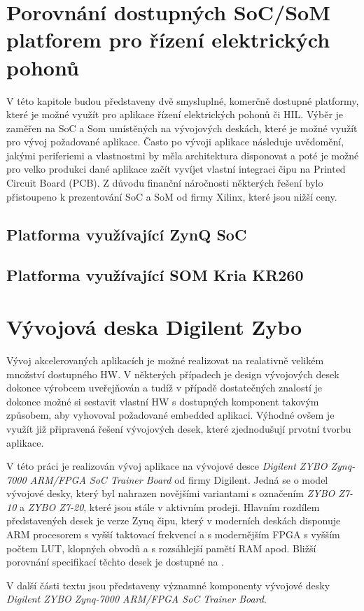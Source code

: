 \documentclass[a4paper, twoside, 11pt]{article}
\begin{document}
	\section{Porovnání dostupných SoC/SoM platforem pro řízení elektrických pohonů}
			V této kapitole budou představeny dvě smysluplné, komerčně dostupné platformy, které je možné využít pro aplikace řízení elektrických pohonů či HIL. Výběr je zaměřen na SoC a Som umístěných na vývojových deskách, které je možné využít pro vývoj požadované aplikace. Často po vývoji aplikace následuje uvědomění, jakými periferiemi a vlastnostmi by měla architektura disponovat a poté je možné pro velko produkci dané aplikace začít vyvíjet vlastní integraci čipu na Printed Circuit Board (PCB). Z důvodu finanční náročnosti některých řešení bylo přistoupeno k prezentování SoC a SoM od firmy Xilinx, které jsou nižší ceny.


			\subsection{Platforma využívající ZynQ SoC}

			\subsection{Platforma využívající SOM Kria KR260}

	\section{Vývojová deska Digilent Zybo}
			Vývoj akcelerovaných aplikacích je možné realizovat na realativně velikém množství dostupného HW. V některých případech je design vývojových desek dokonce výrobcem uveřejňován a tudíž v případě dostatečných znalostí je dokonce možné si sestavit vlastní HW s dostupných komponent takovým způsobem, aby vyhovoval požadované embedded aplikaci. Výhodné ovšem je využít již připravená řešení vývojových desek, které zjednodušují prvotní tvorbu aplikace.\par
			V této práci je realizován vývoj aplikace na vývojové desce \textit{Digilent ZYBO Zynq-7000 ARM/FPGA SoC Trainer Board} od firmy Digilent. \cite{digilent-zybo-7000-docs} Jedná se o model vývojové desky, který byl nahrazen novějšími variantami s označením \textit{ZYBO Z7-10} a \textit{ZYBO Z7-20}, které jsou stále v aktivním prodeji. Hlavním rozdílem představených desek je verze Zynq čipu, který v moderních deskách disponuje ARM procesorem s vyšší taktovací frekvencí a s modernějším FPGA s vyšším počtem LUT, klopných obvodů a s rozsáhlejší pamětí RAM apod. Bližší porovnání specifikací těchto desek je dostupné na \cite{digilent-zybo-compare}.\par
			V další části textu jsou představeny významné komponenty vývojové desky \textit{Digilent ZYBO Zynq-7000 ARM/FPGA SoC Trainer Board}.
\end{document}
